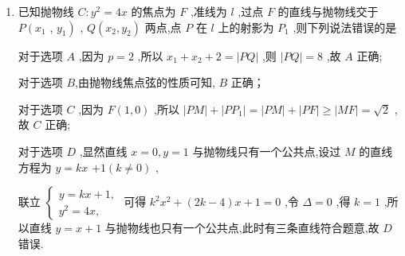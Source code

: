 \begin{enumerate}
\begin{jieda}
        则 $- 3{x}_{1} = {x}_{2} \Longrightarrow  3{x}_{1}^{2} = 4$ ,即 $\left\{  {\begin{array}{l} {x}_{1} = \dfrac{2\sqrt{3}}{3} \\  {x}_{2} =  - 2\sqrt{3} \end{array} \Longrightarrow  k =  - \dfrac{\sqrt{3}}{3}}\right.$ 或 $\left\{  {\begin{array}{l} {x}_{1} =  - \dfrac{2\sqrt{3}}{3} \\  {x}_{2} = 2\sqrt{3} \end{array} \Longrightarrow  k = \dfrac{\sqrt{3}}{3}}\right.$ ,
        
        所以直线的倾斜角为 ${30}^{ \circ  }$ 或 ${150}^{ \circ  }$ .
    \end{jieda}
    
    \item 已知抛物线 $C : {y}^{2} = {4x}$ 的焦点为 $F$ ,准线为 $l$ ,过点 $F$ 的直线与抛物线交于 $P\left( {x}_{1}\right.$ , $\left. {y}_{1}\right)$ , $Q\left( {{x}_{2},{y}_{2}}\right)$ 两点,点 $P$ 在 $l$ 上的射影为 ${P}_{1}$ ,则下列说法错误的是
    \begin{jieda}
        对于选项 ${A}$ ,因为 $p = 2$ ,所以 ${x}_{1} + {x}_{2} + 2 = \left| {PQ}\right|$ ,则 $\left| {PQ}\right|  = 8$ ,故 ${A}$ 正确;
        
        对于选项 $B$,由抛物线焦点弦的性质可知, ${B}$ 正确；
        
        对于选项 ${C}$ ,因为 $F\left( {1,0}\right)$ ,所以 $\left| {PM}\right|  + \left| {P{P}_{1}}\right|  = \left| {PM}\right|  + \left| {PF}\right|  \geq  \left| {MF}\right|  = \sqrt{2}$ ,故 ${C}$ 正确;
        
        对于选项 ${D}$ ,显然直线 $x = 0,y = 1$ 与抛物线只有一个公共点,设过 $M$ 的直线方程为 $y = {kx}$  $+ 1\left( {k \neq  0}\right)$ ,
        
        联立 $\left\{  \begin{array}{l} y = {kx} + 1, \\  {y}^{2} = {4x}, \end{array}\right.$ 可得 ${k}^{2}{x}^{2} + \left( {{2k} - 4}\right) x + 1 = 0$ ,令 $\Delta  = 0$ ,得 $k = 1$ ,所以直线 $y = x + 1$ 与抛物线也只有一个公共点,此时有三条直线符合题意,故 ${D}$ 错误.


\end{jieda}
\end{enumerate}
